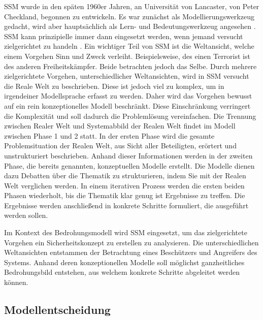 \documentclass[11pt,a4paper]{report}
\begin{document}
SSM wurde in den späten 1960er Jahren, an Universität von Lancaster, von Peter Checkland, begonnen zu entwickeln. Es war zunächst als Modellierungswerkzeug gedacht, wird aber hauptsächlich als Lern- und Bedeutungswerkzeug angesehen \cite{bobwill}. SSM kann prinzipielle immer dann eingesetzt werden, wenn jemand versucht zielgerichtet zu handeln \cite{checkland1}. Ein wichtiger Teil von SSM ist die Weltansicht, welche einem Vorgehen Sinn und Zweck verleiht. Beispielsweise, des einen Terrorist ist des anderen Freiheitskämpfer. Beide betrachten jedoch das Selbe. Durch mehrere zielgerichtete Vorgehen, unterschiedlicher Weltansichten, wird in SSM versucht die Reale Welt zu beschrieben. Diese ist jedoch viel zu komplex, um in irgendeiner Modellsprache erfasst zu werden. Daher wird das Vorgehen bewusst auf ein rein konzeptionelles Modell beschränkt. Diese Einschränkung verringert die Komplexität und soll dadurch die Problemlösung vereinfachen. Die Trennung zwischen Realer Welt und Systemabbild der Realen Welt findet im Modell zwischen Phase 1 und 2 statt. In der ersten Phase wird die gesamte Problemsituation der Realen Welt, aus Sicht aller Beteiligten, erörtert und unstrukturiert beschrieben. Anhand dieser Informationen werden in der zweiten Phase, die bereits genannten, konzeptuellen Modelle erstellt. Die Modelle dienen dazu Debatten über die Thematik zu strukturieren, indem Sie mit der Realen Welt verglichen werden. In einem iterativen Prozess werden die ersten beiden Phasen wiederholt, bis die Thematik klar genug ist Ergebnisse zu treffen. Die Ergebnisse werden anschließend in konkrete Schritte formuliert, die ausgeführt werden sollen.

Im Kontext des Bedrohungsmodell wird SSM eingesetzt, um das zielgerichtete Vorgehen ein Sicherheitskonzept zu erstellen zu analysieren. Die unterschiedlichen Weltansichten entstammen der Betrachtung eines Beschützers und Angreifers des Systems. Anhand deren konzeptionellen Modelle soll möglichst ganzheitliches Bedrohungsbild entstehen, aus welchem konkrete Schritte abgeleitet werden können.

\subsection{Modellentscheidung}
\end{document}
